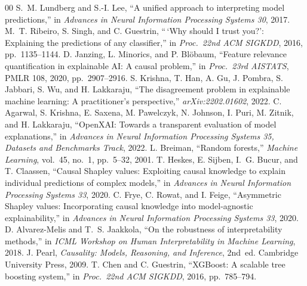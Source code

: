 \documentclass[conference]{IEEEtran}
\begin{document}
\begin{thebibliography}{00}
 S.~M. Lundberg and S.-I. Lee, ``A unified approach to interpreting model predictions,'' in \emph{Advances in Neural Information Processing Systems 30}, 2017.
 M.~T. Ribeiro, S. Singh, and C. Guestrin, ``\,`Why should I trust you?': Explaining the predictions of any classifier,'' in \emph{Proc.\ 22nd ACM SIGKDD}, 2016, pp.~1135--1144.
 D. Janzing, L. Minorics, and P. Bl\"obaum, ``Feature relevance quantification in explainable AI: A causal problem,'' in \emph{Proc.\ 23rd AISTATS}, PMLR 108, 2020, pp.~2907--2916.
 S. Krishna, T. Han, A. Gu, J. Pombra, S. Jabbari, S. Wu, and H. Lakkaraju, ``The disagreement problem in explainable machine learning: A practitioner's perspective,'' \emph{arXiv:2202.01602}, 2022.
 C. Agarwal, S. Krishna, E. Saxena, M. Pawelczyk, N. Johnson, I. Puri, M. Zitnik, and H. Lakkaraju, ``OpenXAI: Towards a transparent evaluation of model explanations,'' in \emph{Advances in Neural Information Processing Systems 35, Datasets and Benchmarks Track}, 2022.
 L. Breiman, ``Random forests,'' \emph{Machine Learning}, vol.~45, no.~1, pp.~5--32, 2001.
 T. Heskes, E. Sijben, I.~G. Bucur, and T. Claassen, ``Causal Shapley values: Exploiting causal knowledge to explain individual predictions of complex models,'' in \emph{Advances in Neural Information Processing Systems 33}, 2020.
 C. Frye, C. Rowat, and I. Feige, ``Asymmetric Shapley values: Incorporating causal knowledge into model-agnostic explainability,'' in \emph{Advances in Neural Information Processing Systems 33}, 2020.
 D. Alvarez-Melis and T.~S. Jaakkola, ``On the robustness of interpretability methods,'' in \emph{ICML Workshop on Human Interpretability in Machine Learning}, 2018.
 J. Pearl, \emph{Causality: Models, Reasoning, and Inference}, 2nd~ed. Cambridge University Press, 2009.
 T. Chen and C. Guestrin, ``XGBoost: A scalable tree boosting system,'' in \emph{Proc.\ 22nd ACM SIGKDD}, 2016, pp.~785--794.
\end{thebibliography}
\end{document}
